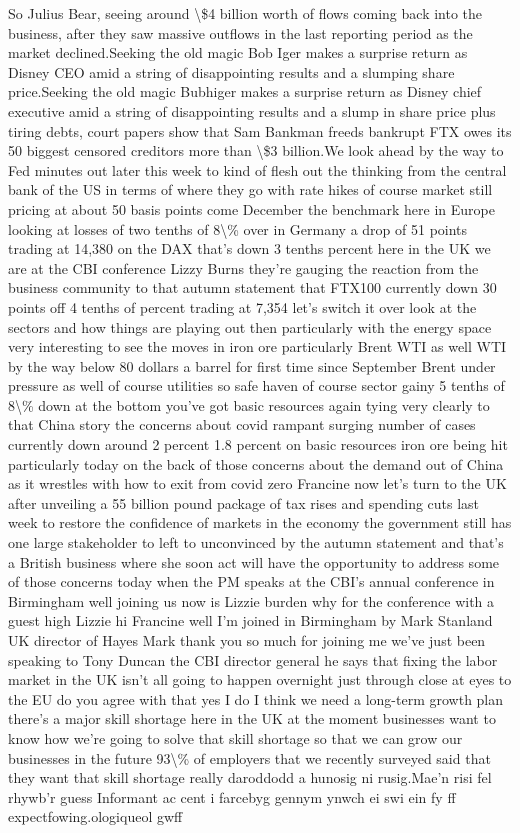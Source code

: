 \documentclass{article}%
\begin{document}
So Julius Bear, seeing around \textbackslash{}\$4 billion worth of flows coming back into the business, after they saw massive outflows in the last reporting period as the market declined.Seeking the old magic Bob Iger makes a surprise return as Disney CEO amid a string of disappointing results and a slumping share price.Seeking the old magic Bubhiger makes a surprise return as Disney chief executive amid a string of disappointing results and a slump in share price plus tiring debts, court papers show that Sam Bankman freeds bankrupt FTX owes its 50 biggest censored creditors more than \textbackslash{}\$3 billion.We look ahead by the way to Fed minutes out later this week to kind of flesh out the thinking from the central bank of the US in terms of where they go with rate hikes of course market still pricing at about 50 basis points come December the benchmark here in Europe looking at losses of two tenths of 8\textbackslash{}\% over in Germany a drop of 51 points trading at 14,380 on the DAX that's down 3 tenths percent here in the UK we are at the CBI conference Lizzy Burns they're gauging the reaction from the business community to that autumn statement that FTX100 currently down 30 points off 4 tenths of percent trading at 7,354 let's switch it over look at the sectors and how things are playing out then particularly with the energy space very interesting to see the moves in iron ore particularly Brent WTI as well WTI by the way below 80 dollars a barrel for first time since September Brent under pressure as well of course utilities so safe haven of course sector gainy 5 tenths of 8\textbackslash{}\% down at the bottom you've got basic resources again tying very clearly to that China story the concerns about covid rampant surging number of cases currently down around 2 percent 1.8 percent on basic resources iron ore being hit particularly today on the back of those concerns about the demand out of China as it wrestles with how to exit from covid zero Francine now let's turn to the UK after unveiling a 55 billion pound package of tax rises and spending cuts last week to restore the confidence of markets in the economy the government still has one large stakeholder to left to unconvinced by the autumn statement and that's a British business where she soon act will have the opportunity to address some of those concerns today when the PM speaks at the CBI's annual conference in Birmingham well joining us now is Lizzie burden why for the conference with a guest high Lizzie hi Francine well I'm joined in Birmingham by Mark Stanland UK director of Hayes Mark thank you so much for joining me we've just been speaking to Tony Duncan the CBI director general he says that fixing the labor market in the UK isn't all going to happen overnight just through close at eyes to the EU do you agree with that yes I do I think we need a long{-}term growth plan there's a major skill shortage here in the UK at the moment businesses want to know how we're going to solve that skill shortage so that we can grow our businesses in the future 93\textbackslash{}\% of employers that we recently surveyed said that they want that skill shortage really  daroddodd a hunosig ni rusig.Mae'n risi fel rhywb'r guess Informant ac cent i farcebyg gennym ynwch ei swi ein fy ff expectfowing.ologiqueol gwff   
\end{document}

